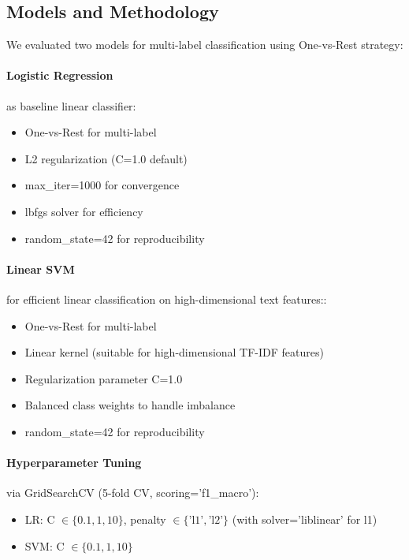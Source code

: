\documentclass[acmlarge,screen,nonacm]{acmart}
\begin{document}
\subsection{Models and Methodology}

We evaluated two models for multi-label classification using One-vs-Rest strategy:

\paragraph{Logistic Regression} as baseline linear classifier:
\begin{itemize}
    \item One-vs-Rest for multi-label
    \item L2 regularization (C=1.0 default)
    \item max\_iter=1000 for convergence
    \item lbfgs solver for efficiency
    \item random\_state=42 for reproducibility
\end{itemize}

\paragraph{Linear SVM} for efficient linear classification on high-dimensional text features::
\begin{itemize}
    \item One-vs-Rest for multi-label
    \item Linear kernel (suitable for high-dimensional TF-IDF features)
    \item Regularization parameter C=1.0
    \item Balanced class weights to handle imbalance
    \item random\_state=42 for reproducibility
\end{itemize}

\paragraph{Hyperparameter Tuning} via GridSearchCV (5-fold CV, scoring='f1\_macro'):
\begin{itemize}
    \item LR: C $\in \{0.1, 1, 10\}$, penalty $\in \{\text{'l1'}, \text{'l2'}\}$ (with solver='liblinear' for l1)
    \item SVM: C $\in \{0.1, 1, 10\}$
\end{itemize}
\end{document}
